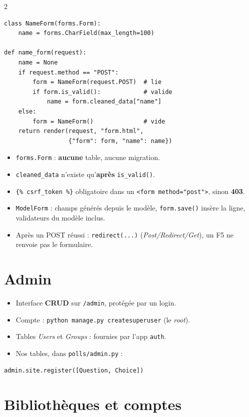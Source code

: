 \documentclass[a4paper,10pt]{article}
\newcommand{\co}[1]{\texttt{\textcolor{codefg}{#1}}}
\begin{document}
\begin{multicols}{2}
\begin{lstlisting}
class NameForm(forms.Form):
    name = forms.CharField(max_length=100)

def name_form(request):
    name = None
    if request.method == "POST":
        form = NameForm(request.POST)  # lie
        if form.is_valid():            # valide
            name = form.cleaned_data["name"]
    else:
        form = NameForm()              # vide
    return render(request, "form.html",
                  {"form": form, "name": name})
\end{lstlisting}

\begin{itemize}
  \item \co{forms.Form} : \textbf{aucune} table, aucune migration.
  \item \co{cleaned\_data} n'existe qu'\textbf{après} \co{is\_valid()}.
  \item \co{\{\% csrf\_token \%\}} obligatoire dans un \co{<form
        method="post">}, sinon \textbf{403}.
  \item \co{ModelForm} : champs générés depuis le modèle,
        \co{form.save()} insère la ligne, validateurs du modèle inclus.
  \item Après un POST réussi : \co{redirect(...)}
        (\emph{Post/Redirect/Get}), un F5 ne renvoie pas le formulaire.
\end{itemize}

\section{Admin}

\begin{itemize}
  \item Interface \textbf{CRUD} sur \co{/admin}, protégée par un login.
  \item Compte : \co{python manage.py createsuperuser} (le \emph{root}).
  \item Tables \emph{Users} et \emph{Groups} : fournies par l'app
        \co{auth}.
  \item Nos tables, dans \co{polls/admin.py} :
\end{itemize}
\begin{lstlisting}
admin.site.register([Question, Choice])
\end{lstlisting}

\section{Bibliothèques et comptes}


\end{multicols}
\end{document}
